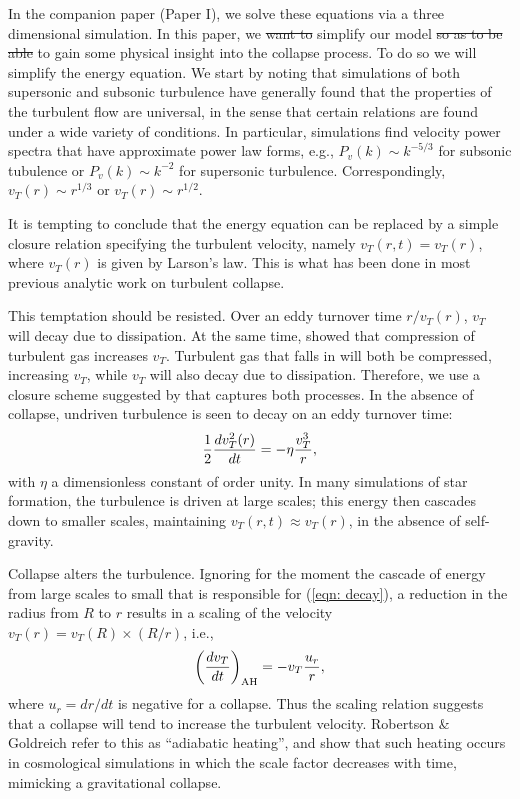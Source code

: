 \documentclass[iop,apj,numberedappendix]{emulateapj}
\newcommand       \phil[1]      {{\color{blue} #1}}
\newcommand       \be		{\begin{equation}}
\newcommand       \ee		{\end{equation}}
\begin{document}
In the companion paper \phil{(Paper I),} we solve these equations via a three
dimensional simulation. In this paper, we \phil{\sout{ want to}} simplify our model
\phil{\sout{so as to be able}} to gain some physical insight into the collapse
process. To do so we will simplify the energy equation. We start by
noting that simulations of both supersonic and subsonic turbulence
have generally found that the properties of the turbulent flow are
universal, in the sense that certain relations are found under a wide
variety of conditions. In particular, simulations find velocity power
spectra that have approximate power law forms, e.g., $P_v(k)\sim
k^{-5/3}$ for subsonic tubulence or $P_v(k)\sim k^{-2}$ for supersonic
turbulence. Correspondingly, $v_T(r)\sim r^{1/3}$ or $v_T(r)\sim
r^{1/2}$.

It is tempting to conclude that the energy equation 
can be replaced by a simple closure relation specifying the
turbulent velocity, namely $v_T(r,t)=v_T(r)$, where $v_T(r)$ is given
by Larson's law. This is what has been done in most previous analytic
work on turbulent collapse.

This temptation should be resisted.  
\phil{Over an eddy turnover time $r/v_T(r)$, $v_T$ will decay due to
  dissipation.  At the same time, \citet{2012ApJ...750L..31R} showed
  that compression of turbulent gas increases $v_T$. Turbulent gas
  that falls in will both be compressed, increasing $v_T$, while $v_T$
  will also decay due to dissipation.  }
{\phil Therefore, we} use a closure scheme suggested by
\citet{2012ApJ...750L..31R} \phil{that captures both processes}. In the absence of collapse, undriven
turbulence is seen to decay on an eddy turnover time:
%
\be  \label{eqn: decay}%
{1\over2}{dv_T^2(r)\over dt} = -\eta {v_T^3\over r},
\ee  %
%
with $\eta $ a dimensionless constant of order unity. In many
simulations of star formation, the turbulence is driven at large
scales; this energy then cascades down to smaller scales, maintaining
$v_T(r,t)\approx v_T(r)$, in the absence of self-gravity.

Collapse alters the turbulence. Ignoring for the moment the cascade of
energy from large scales to small that is responsible for
(\ref{eqn: decay}), a reduction in the radius from $R$ to $r$ results in a
scaling of the velocity $v_T(r) = v_T(R)\times (R/r)$, i.e.,
%
\be  %
\left({dv_T\over dt}\right)_{\rm AH}=-v_T{u_r\over r},
\ee  %
%
where $u_r=dr/dt$ is negative for a collapse. Thus the scaling relation suggests
that a collapse will tend to increase the turbulent
velocity. Robertson \& Goldreich refer to this as ``adiabatic
heating'', and show that such heating occurs in cosmological
simulations in which the scale factor decreases with time, mimicking a
gravitational collapse.
\end{document}
